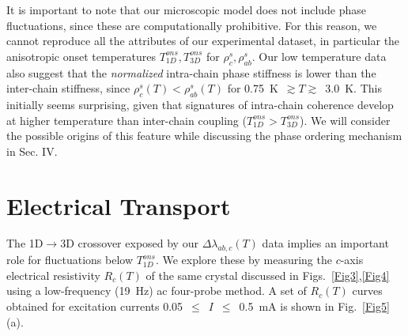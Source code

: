 \documentclass[prb,twocolumn,showpacs,preprintnumbers,amsmath,amssymb,floatfix,groupedaddress,superscriptaddress,aps,10pt]{revtex4-1}
\begin{document}
It is important to note that our microscopic model does not include phase fluctuations, since these are computationally prohibitive.  For this reason, we cannot reproduce all the attributes of our experimental dataset, in particular the anisotropic onset temperatures $T_{1D}^{ons},T_{3D}^{ons}$ for $\rho^s_c,\rho^s_{ab}$.  Our low temperature data also suggest that the \emph{normalized} intra-chain phase stiffness is lower than the inter-chain stiffness, since $\rho^s_c(T)<\rho^s_{ab}(T)$ for 0.75~K~$\gtrsim T \gtrsim$~3.0~K.  This initially seems surprising, given that signatures of intra-chain coherence develop at higher temperature than inter-chain coupling ($T_{1D}^{ons}>T_{3D}^{ons}$).  We will consider the possible origins of this feature while discussing the phase ordering mechanism in Sec. IV.  

\section{Electrical Transport}

The 1D$\rightarrow$3D crossover exposed by our $\Delta\lambda_{ab,c}(T)$ data implies an important role for fluctuations below $T_{1D}^{ons}$.  We explore these by measuring the $c$-axis electrical resistivity $R_c(T)$ of the same crystal discussed in Figs.~\ref{Fig3},\ref{Fig4} using a low-frequency (19~Hz) ac four-probe method.  A set of $R_c(T)$ curves obtained for excitation currents 0.05~$\leq$~$I$~$\leq$~0.5~mA is shown in Fig.~\ref{Fig5}(a). 
\end{document}
